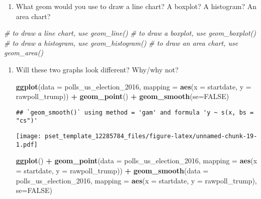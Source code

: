 \documentclass[
]{article}
\newenvironment{Shaded}{\begin{snugshade}}{\end{snugshade}}
\newcommand{\CommentTok}[1]{\textcolor[rgb]{0.56,0.35,0.01}{\textit{#1}}}
\newcommand{\DataTypeTok}[1]{\textcolor[rgb]{0.13,0.29,0.53}{#1}}
\newcommand{\DecValTok}[1]{\textcolor[rgb]{0.00,0.00,0.81}{#1}}
\newcommand{\KeywordTok}[1]{\textcolor[rgb]{0.13,0.29,0.53}{\textbf{#1}}}
\newcommand{\NormalTok}[1]{#1}
\newcommand{\OperatorTok}[1]{\textcolor[rgb]{0.81,0.36,0.00}{\textbf{#1}}}
\newcommand{\OtherTok}[1]{\textcolor[rgb]{0.56,0.35,0.01}{#1}}
\newcommand{\StringTok}[1]{\textcolor[rgb]{0.31,0.60,0.02}{#1}}
\providecommand{\tightlist}{%
  \setlength{\itemsep}{0pt}\setlength{\parskip}{0pt}}
\begin{document}
\begin{enumerate}
\def\labelenumi{\arabic{enumi}.}
\tightlist
\item
  What geom would you use to draw a line chart? A boxplot? A histogram?
  An area chart?
\end{enumerate}

\begin{Shaded}
\begin{Highlighting}[]
\CommentTok{# to draw a line chart, use geom_line()}
\CommentTok{# to draw a boxplot, use geom_boxplot()}
\CommentTok{# to draw a histogram, use geom_histogram()}
\CommentTok{# to draw an area chart, use geom_area()}
\end{Highlighting}
\end{Shaded}

\begin{enumerate}
\def\labelenumi{\arabic{enumi}.}
\item
  Will these two graphs look different? Why/why not?

\begin{Shaded}
\begin{Highlighting}[]
\KeywordTok{ggplot}\NormalTok{(}\DataTypeTok{data =}\NormalTok{ polls_us_election_}\DecValTok{2016}\NormalTok{, }
       \DataTypeTok{mapping =} \KeywordTok{aes}\NormalTok{(}\DataTypeTok{x =}\NormalTok{ startdate, }
                     \DataTypeTok{y =}\NormalTok{ rawpoll_trump)) }\OperatorTok{+}
\StringTok{  }\KeywordTok{geom_point}\NormalTok{() }\OperatorTok{+}
\StringTok{  }\KeywordTok{geom_smooth}\NormalTok{(}\DataTypeTok{se=}\OtherTok{FALSE}\NormalTok{)}
\end{Highlighting}
\end{Shaded}

\begin{verbatim}
## `geom_smooth()` using method = 'gam' and formula 'y ~ s(x, bs = "cs")'
\end{verbatim}

  \texttt{[image: pset\_template\_12285784\_files/figure-latex/unnamed-chunk-19-1.pdf]}

\begin{Shaded}
\begin{Highlighting}[]
\KeywordTok{ggplot}\NormalTok{() }\OperatorTok{+}
\StringTok{  }\KeywordTok{geom_point}\NormalTok{(}\DataTypeTok{data =}\NormalTok{ polls_us_election_}\DecValTok{2016}\NormalTok{, }
             \DataTypeTok{mapping =} \KeywordTok{aes}\NormalTok{(}\DataTypeTok{x =}\NormalTok{ startdate, }
                           \DataTypeTok{y =}\NormalTok{ rawpoll_trump)) }\OperatorTok{+}
\StringTok{  }\KeywordTok{geom_smooth}\NormalTok{(}\DataTypeTok{data =}\NormalTok{ polls_us_election_}\DecValTok{2016}\NormalTok{, }
              \DataTypeTok{mapping =} \KeywordTok{aes}\NormalTok{(}\DataTypeTok{x =}\NormalTok{ startdate, }
                            \DataTypeTok{y =}\NormalTok{ rawpoll_trump), }\DataTypeTok{se=}\OtherTok{FALSE}\NormalTok{)}
\end{Highlighting}
\end{Shaded}


\end{enumerate}
\end{document}
